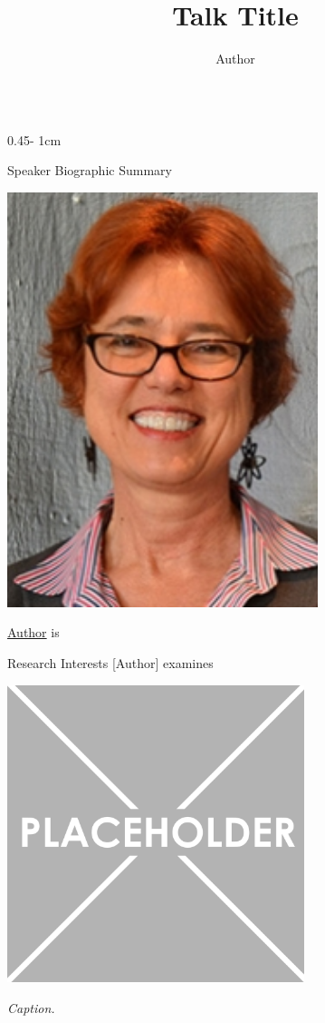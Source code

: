\documentclass{../psuposter}
\title{Talk Title}
\author{Author}
\institute{Affiliation}
\begin{document}
\begin{frame}
\begin{columns}[t, totalwidth=\textwidth]
\begin{column}{0.45\textwidth - 1cm}


    \begin{block}{Speaker Biographic Summary}
    	\begin{center}
    		\includegraphics[width=0.68\textwidth]{images/portrait}
    	\end{center}
    	\href{}{Author} is
    \end{block}


    \begin{block}{Research Interests}
        [Author] examines 
        \begin{center}
	    	\includegraphics[width=0.65\textwidth]{images/research}    		
    	\end{center}
    	\textit{Caption.} 
    	

\end{block}
\end{column}
\end{columns}
\end{frame}
\end{document}

